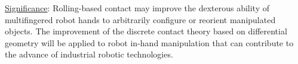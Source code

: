 
\noindent\uline{Significance}: Rolling-based contact may improve the dexterous ability of multifingered robot hands to arbitrarily configure or reorient manipulated objects. The improvement of the discrete contact theory based on differential geometry will be applied to robot in-hand manipulation that can contribute to the advance of industrial robotic technologies.



